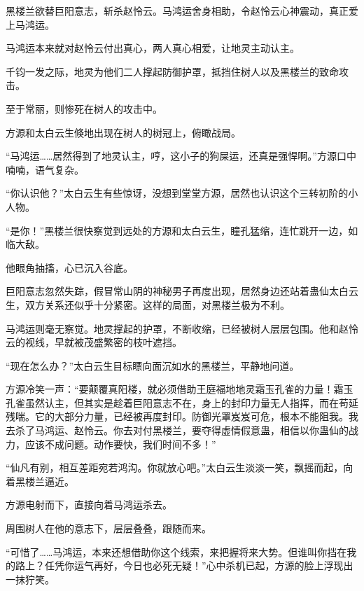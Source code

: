 \begin{this_body}
黑楼兰欲替巨阳意志，斩杀赵怜云。马鸿运舍身相助，令赵怜云心神震动，真正爱上马鸿运。

马鸿运本来就对赵怜云付出真心，两人真心相爱，让地灵主动认主。

千钧一发之际，地灵为他们二人撑起防御护罩，抵挡住树人以及黑楼兰的致命攻击。

至于常丽，则惨死在树人的攻击中。

方源和太白云生倏地出现在树人的树冠上，俯瞰战局。

“马鸿运……居然得到了地灵认主，哼，这小子的狗屎运，还真是强悍啊。”方源口中喃喃，语气复杂。

“你认识他？”太白云生有些惊讶，没想到堂堂方源，居然也认识这个三转初阶的小人物。

“是你！”黑楼兰很快察觉到远处的方源和太白云生，瞳孔猛缩，连忙跳开一边，如临大敌。

他眼角抽搐，心已沉入谷底。

巨阳意志忽然失踪，假冒常山阴的神秘男子再度出现，居然身边还站着蛊仙太白云生，双方关系还似乎十分紧密。这样的局面，对黑楼兰极为不利。

马鸿运则毫无察觉。地灵撑起的护罩，不断收缩，已经被树人层层包围。他和赵怜云的视线，早就被茂盛繁密的枝叶遮挡。

“现在怎么办？”太白云生目标瞟向面沉如水的黑楼兰，平静地问道。

方源冷笑一声：“要颠覆真阳楼，就必须借助王庭福地地灵霜玉孔雀的力量！霜玉孔雀虽然认主，但其实是趁着巨阳意志不在，身上的封印力量无人指挥，而在苟延残喘。它的大部分力量，已经被再度封印。防御光罩岌岌可危，根本不能阻我。我去杀了马鸿运、赵怜云。你去对付黑楼兰，要夺得虚情假意蛊，相信以你蛊仙的战力，应该不成问题。动作要快，我们时间不多！”

“仙凡有别，相互差距宛若鸿沟。你就放心吧。”太白云生淡淡一笑，飘摇而起，向着黑楼兰逼近。

方源电射而下，直接向着马鸿运杀去。

周围树人在他的意志下，层层叠叠，跟随而来。

“可惜了……马鸿运，本来还想借助你这个线索，来把握将来大势。但谁叫你挡在我的路上？任凭你运气再好，今日也必死无疑！”心中杀机已起，方源的脸上浮现出一抹狞笑。

\end{this_body}

